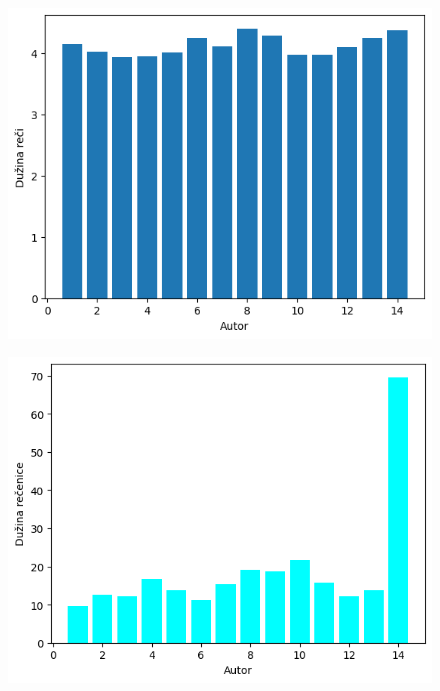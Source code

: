 \documentclass{article}
\begin{document}
\begin{figure}[ht]
    \centering
    \begin{minipage}{0.4\textwidth}
        \centering
        \includegraphics[width=\textwidth]{reci.png}
        \renewcommand{\thefigure}{} 
        \captionsetup{labelformat=empty}
        \label{fig:udeo1}
    \end{minipage}\hfill
    \begin{minipage}{0.4\textwidth}
        \centering
        \includegraphics[width=\textwidth]{recenice.png}
        \renewcommand{\thefigure}{} 
        \captionsetup{labelformat=empty}

\end{minipage}
\end{figure}
\end{document}
